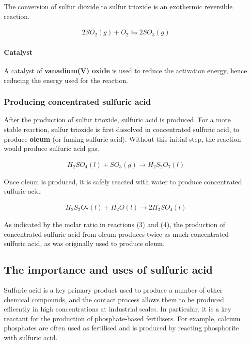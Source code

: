 \documentclass[12pt, a4paper]{article}
\begin{document}
The conversion of sulfur dioxide to sulfur trioxide is an exothermic reversible reaction.

\begin{align}
	2SO_{2}(g) + O_{2} \leftrightharpoons 2SO_{3}(g)
\end{align}

\paragraph{Catalyst}
A catalyst of \textbf{vanadium(V) oxide} is used to reduce the activation energy, hence reducing the energy used for the reaction.

\pagebreak

\subsubsection{Producing concentrated sulfuric acid}

After the production of sulfur trioxide, sulfuric acid is produced. For a more stable reaction, sulfur trioxide is first dissolved in concentrated sulfuric acid, to produce \textbf{oleum} (or fuming sulfuric acid). Without this initial step, the reaction would produce sulfuric acid gas.

\begin{align}
	H_{2}SO_{4}(l) + SO_{3}(g) \rightarrow H_{2}S_{2}O_{7}(l)
\end{align}

Once oleum is produced, it is safely reacted with water to produce concentrated sulfuric acid. 

\begin{align}
	H_{2}S_{2}O_{7}(l) + H_{2}O(l) \rightarrow 2H_{2}SO_{4}(l)
\end{align}

As indicated by the molar ratio in reactions (3) and (4), the production of concentrated sulfuric acid from oleum produces twice as much concentrated sulfuric acid, as was originally used to produce oleum.

\subsection{The importance and uses of sulfuric acid}

Sulfuric acid is a key primary product used to produce a number of other chemical compounds, and the contact process allows them to be produced efficently in high concentrations at industrial scales. In particular, it is a key reactant for the production of phosphate-based fertilisers. For example, calcium phosphates are often used as fertilised and is produced by reacting phosphorite with sulfuric acid.
\end{document}
